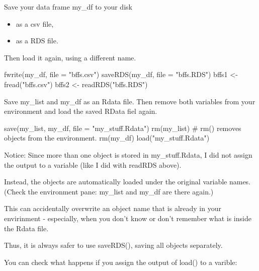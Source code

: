 \documentclass[
  letterpaper,
  DIV=11,
  numbers=noendperiod]{scrartcl}
\newenvironment{Shaded}{\begin{snugshade}}{\end{snugshade}}
\newcommand{\AttributeTok}[1]{\textcolor[rgb]{0.40,0.45,0.13}{#1}}
\newcommand{\CommentTok}[1]{\textcolor[rgb]{0.37,0.37,0.37}{#1}}
\newcommand{\FunctionTok}[1]{\textcolor[rgb]{0.28,0.35,0.67}{#1}}
\newcommand{\NormalTok}[1]{\textcolor[rgb]{0.00,0.23,0.31}{#1}}
\newcommand{\OtherTok}[1]{\textcolor[rgb]{0.00,0.23,0.31}{#1}}
\newcommand{\StringTok}[1]{\textcolor[rgb]{0.13,0.47,0.30}{#1}}
\begin{document}
Save your data frame my\_df to your disk

\begin{itemize}
\item
  as a csv file,
\item
  as a RDS file.
\end{itemize}

Then load it again, using a different name.

\begin{Shaded}
\begin{Highlighting}[]
\FunctionTok{fwrite}\NormalTok{(my\_df, }\AttributeTok{file =} \StringTok{"bffs.csv"}\NormalTok{)}
\FunctionTok{saveRDS}\NormalTok{(my\_df, }\AttributeTok{file =} \StringTok{"bffs.RDS"}\NormalTok{)}
\NormalTok{bffs1 }\OtherTok{\textless{}{-}} \FunctionTok{fread}\NormalTok{(}\StringTok{"bffs.csv"}\NormalTok{)}
\NormalTok{bffs2 }\OtherTok{\textless{}{-}} \FunctionTok{readRDS}\NormalTok{(}\StringTok{"bffs.RDS"}\NormalTok{)}
\end{Highlighting}
\end{Shaded}

Save my\_list and my\_df as an Rdata file. Then remove both variables
from your environment and load the saved RData fiel again.

\begin{Shaded}
\begin{Highlighting}[]
\FunctionTok{save}\NormalTok{(my\_list, my\_df, }\AttributeTok{file =} \StringTok{"my\_stuff.Rdata"}\NormalTok{)}
\FunctionTok{rm}\NormalTok{(my\_list) }\CommentTok{\# rm() removes objects from the environment.}
\FunctionTok{rm}\NormalTok{(my\_df)}
\FunctionTok{load}\NormalTok{(}\StringTok{"my\_stuff.Rdata"}\NormalTok{)}
\end{Highlighting}
\end{Shaded}

Notice: Since more than one object is stored in my\_stuff.Rdata, I did
not assign the output to a variable (like I did with readRDS above).

Instead, the objects are automatically loaded under the original
variable names. (Check the environment pane: my\_list and my\_df are
there again.)

This can accidentally overwrite an object name that is already in your
envirinment - especially, when you don't know or don't remember what is
inside the Rdata file.

Thus, it is always safer to use saveRDS(), saving all objects
separately.

You can check what happens if you assign the output of load() to a
varible:
\end{document}
